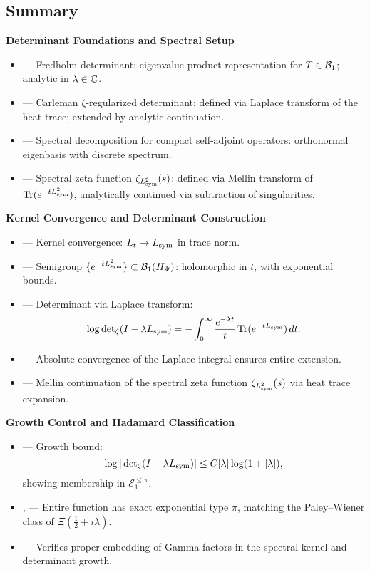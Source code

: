 \subsection*{Summary}

\textbf{Determinant Foundations and Spectral Setup}
\begin{itemize}
  \item {} — Fredholm determinant: eigenvalue product representation for \( T \in \mathcal{B}_1 \); analytic in \( \lambda \in \mathbb{C} \).
  \item {} — Carleman \(\zeta\)-regularized determinant: defined via Laplace transform of the heat trace; extended by analytic continuation.
  \item {} — Spectral decomposition for compact self-adjoint operators: orthonormal eigenbasis with discrete spectrum.
  \item {} — Spectral zeta function \( \zeta_{L_{\mathrm{sym}}^2}(s) \): defined via Mellin transform of \( \operatorname{Tr}(e^{-t L_{\mathrm{sym}}^2}) \), analytically continued via subtraction of singularities.
\end{itemize}

\textbf{Kernel Convergence and Determinant Construction}
\begin{itemize}
  \item {} — Kernel convergence: \( L_t \to L_{\mathrm{sym}} \) in trace norm.
  \item {} — Semigroup \( \{e^{-tL_{\mathrm{sym}}^2}\} \subset \mathcal{B}_1(H_{\Psi}) \): holomorphic in \( t \), with exponential bounds.
  \item {} — Determinant via Laplace transform:
  \[
  \log \det\nolimits_{\zeta}(I - \lambda L_{\mathrm{sym}}) = - \int_0^\infty \frac{e^{-\lambda t}}{t} \operatorname{Tr}(e^{-t L_{\mathrm{sym}}}) \, dt.
  \]
  \item {} — Absolute convergence of the Laplace integral ensures entire extension.
  \item {} — Mellin continuation of the spectral zeta function \( \zeta_{L_{\mathrm{sym}}^2}(s) \) via heat trace expansion.
\end{itemize}

\textbf{Growth Control and Hadamard Classification}
\begin{itemize}
  \item {} — Growth bound:
  \[
  \log |\det\nolimits_{\zeta}(I - \lambda L_{\mathrm{sym}})| \le C |\lambda| \log(1 + |\lambda|),
  \]
  showing membership in \( \mathcal{E}_1^{\leq \pi} \).
  \item {},  — Entire function has exact exponential type \( \pi \), matching the Paley--Wiener class of \( \Xi(\tfrac{1}{2} + i\lambda) \).
  \item {} — Verifies proper embedding of Gamma factors in the spectral kernel and determinant growth.
\end{itemize}

